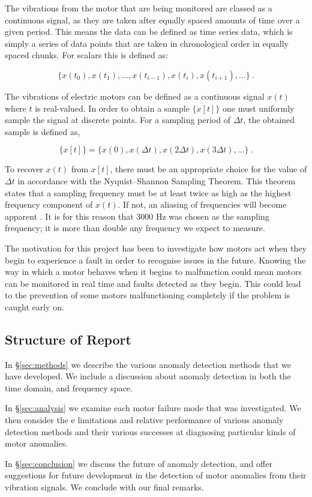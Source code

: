 The vibrations from the motor that are being monitored are classed as a continuous signal, as they are taken after equally spaced amounts of time over a given period. This means the data can be defined as time series data, which is simply a series of data points that are taken in chronological order in equally spaced chunks. For scalars this is defined as:

\begin{equation}
    \{x(t_0), x(t_1), ..., x(t_{i-1}), x(t_i), x(t_{i+1}), ...\}~.
\end{equation}

The vibrations of electric motors can be defined as a continuous signal $x(t)$ where $t$ is real-valued. In order to obtain a sample $\{x[t]\}$ one must uniformly sample the signal at discrete points. For a sampling period of $\Delta t$, the obtained sample is defined as,

\begin{equation}
    \{x[t]\} = \{x(0), x(\Delta t), x(2\Delta t), x(3\Delta t),...\}~.
\end{equation}

To recover $x(t)$ from $x[t]$, there must be an appropriate choice for the value of $\Delta t$ in accordance with the Nyquist–Shannon Sampling Theorem. This theorem states that a sampling frequency must be at least twice as high as the highest frequency component of $x(t)$. If not, an aliasing of frequencies will become apparent \cite{Ficker2015}. It is for this reason that 3000 Hz was chosen as the sampling frequency; it is more than double any frequency we expect to measure.

The motivation for this project has been to investigate how motors act when they begin to experience a fault in order to recognise issues in the future. Knowing the way in which a motor behaves when it begins to malfunction could mean motors can be monitored in real time and faults detected as they begin. This could lead to the prevention of some motors malfunctioning completely if the problem is caught early on.


\subsection{Structure of Report}

In \S\ref{sec:methods} we describe the various anomaly detection methods that we have developed. %
We include a discussion about anomaly detection in both the time domain, and frequency space.

In \S\ref{sec:analysis} we examine each motor failure mode that was investigated. We then consider the e limitations and relative performance of various anomaly detection methods and their various successes at diagnosing particular kinds of motor anomalies.

In \S\ref{sec:conclusion} we discuss the future of anomaly detection, and offer suggestions for future development in the detection of motor anomalies from their vibration signals. We conclude with our final remarks.